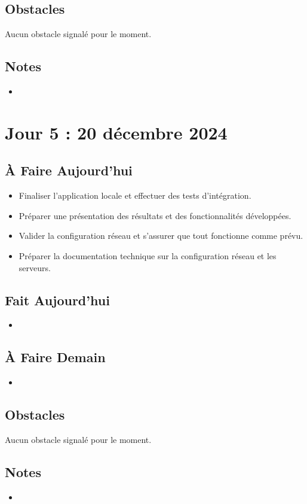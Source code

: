 \documentclass[a4paper,12pt]{report}
\begin{document}
\subsection{Obstacles}
Aucun obstacle signalé pour le moment.

\subsection{Notes}
\begin{itemize}
    \item
\end{itemize}

\section{Jour 5 : 20 décembre 2024}

\subsection{À Faire Aujourd'hui}
\begin{itemize}
    \item Finaliser l'application locale et effectuer des tests d'intégration.
    \item Préparer une présentation des résultats et des fonctionnalités développées.
    \item Valider la configuration réseau et s'assurer que tout fonctionne comme prévu.
    \item Préparer la documentation technique sur la configuration réseau et les serveurs.
\end{itemize}

\subsection{Fait Aujourd'hui}
\begin{itemize}
    \item
\end{itemize}

\subsection{À Faire Demain}
\begin{itemize}
    \item
\end{itemize}

\subsection{Obstacles}
Aucun obstacle signalé pour le moment.

\subsection{Notes}
\begin{itemize}
    \item
\end{itemize}
\end{document}
